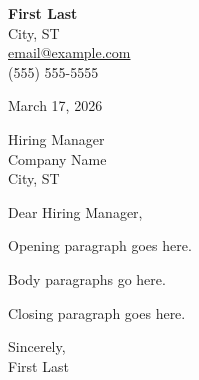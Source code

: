 \documentclass[11pt,letterpaper]{article}
\begin{document}
\textbf{First Last} \\
City, ST \\
\href{mailto:email@example.com}{email@example.com} \\
(555) 555-5555

\vspace{12pt}

March 17, 2026

\vspace{12pt}

Hiring Manager \\
Company Name \\
City, ST

\vspace{12pt}

Dear Hiring Manager,

Opening paragraph goes here.

Body paragraphs go here.

Closing paragraph goes here.

\vspace{12pt}

Sincerely, \\
First Last
\end{document}
